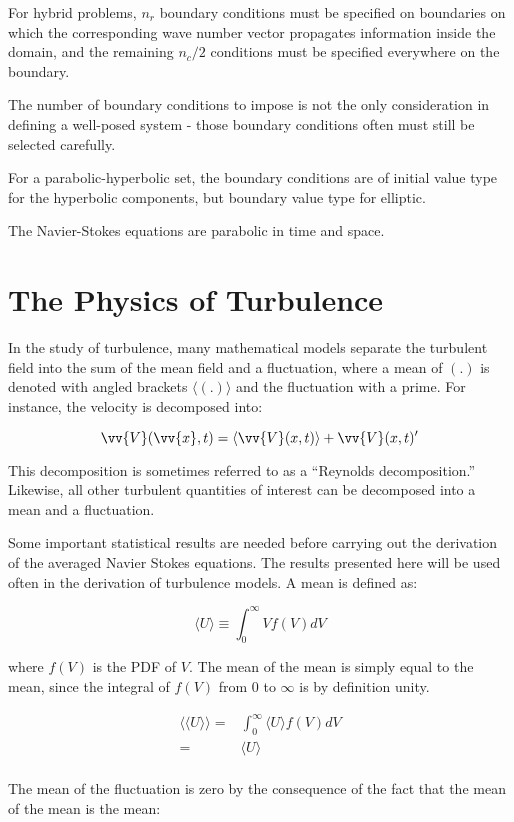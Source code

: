 \documentclass[10pt]{article}
\newcommand{\beq}{\begin{equation}}
\newcommand{\eeq}{\end{equation}}
\newcommand{\beqa}{\begin{equation}\begin{aligned}}
\newcommand{\eeqa}{\end{aligned}\end{equation}}
\newcommand{\la}{\langle}
\newcommand{\ra}{\rangle}
\begin{document}
\begin{flushleft}
For hybrid problems, \(n_r\) boundary conditions must be specified on boundaries on which the corresponding wave number vector propagates information inside the domain, and the remaining \(n_c/2\) conditions must be specified everywhere on the boundary.

The number of boundary conditions to impose is not the only consideration in defining a well-posed system - those boundary conditions often must still be selected carefully.

For a parabolic-hyperbolic set, the boundary conditions are of initial value type for the hyperbolic components, but boundary value type for elliptic.

The Navier-Stokes equations are parabolic in time and space.

\section{The Physics of Turbulence}

In the study of turbulence, many mathematical models separate the turbulent field into the sum of the mean field and a fluctuation, where a mean of \((.)\) is denoted with angled brackets \(\la(.)\ra\) and the fluctuation with a prime. For instance, the velocity is decomposed into:

\beq
\vv{V}(\vv{x},t)=\la\vv{V}(x,t)\rangle+\vv{V}(x,t)'
\eeq

This decomposition is sometimes referred to as a ``Reynolds decomposition.'' Likewise, all other turbulent quantities of interest can be decomposed into a mean and a fluctuation. 

\begin{tcolorbox}[breakable]
Some important statistical results are needed before carrying out the derivation of the averaged Navier Stokes equations. The results presented here will be used often in the derivation of turbulence models. A mean is defined as:

\beq
\la U\ra\equiv\int_{0}^{\infty}Vf(V)dV
\eeq

where \(f(V)\) is the PDF of \(V\). The mean of the mean is simply equal to the mean, since the integral of \(f(V)\) from 0 to \(\infty\) is by definition unity. 

\beqa
\la\la U\ra\ra=&\int_{0}^{\infty}\la U\ra f(V)dV\\
=&\la U\ra\\
\eeqa

The mean of the fluctuation is zero by the consequence of the fact that the mean of the mean is the mean:


\end{tcolorbox}
\end{flushleft}
\end{document}
